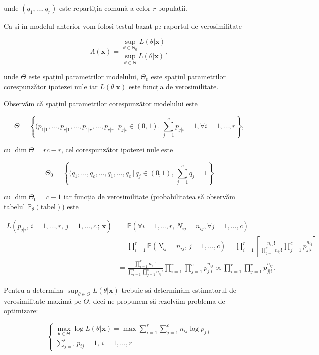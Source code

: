 \documentclass[]{article}
\begin{document}
unde \((q_1,\ldots, q_r)\) este repartiția comună a celor \(r\)
populații.

Ca și în modelul anterior vom folosi testul bazat pe raportul de
verosimilitate

\[
  \Lambda(\mathbf{x})=\frac{\sup_{\theta\in\Theta_0}L(\theta|\mathbf{x})}{\sup_{\theta\in\Theta}L(\theta|\mathbf{x})},
\]

unde \(\Theta\) este spațiul parametrilor modelului, \(\Theta_0\) este
spațiul parametrilor corespunzător ipotezei nule iar
\(L(\theta|\mathbf{x})\) este funcția de verosimilitate.

Observăm că spațiul parametrilor corespunzător modelului este

\[
\Theta = \left\{(p_{1|1},\ldots, p_{c|1},\ldots, p_{1|r},\ldots,p_{c|r}\,|\,p_{j|i}\in(0,1),\,\sum_{j = 1}^{c}p_{j|i} = 1, \forall i = 1,\ldots,r\right\},
\]

cu \(\dim{\Theta} = rc-r\), cel corespunzător ipotezei nule este

\[
\Theta_0 = \left\{(q_{1},\ldots, q_{c},\ldots, q_{1},\ldots,q_{c}\,|\,q_{j}\in(0,1),\,\sum_{j = 1}^{c}q_j = 1\right\}
\]

cu \(\dim{\Theta_0} = c-1\) iar funcția de verosimilitate
(probabilitatea să observăm tabelul
\(\mathbb{P}_{\theta}(\text{tabel})\)) este

\begin{align*}
  L(p_{j|i},\,i = 1,\ldots, r,\, j = 1,\ldots,c\,;\,\mathbf{x}) &= \mathbb{P}(\forall i = 1,\ldots, r,\, N_{ij} = n_{ij},\forall j = 1,\ldots,c) \\
    &= \prod_{i = 1}^{r}\mathbb{P}(N_{ij} = n_{ij},\, j = 1,\ldots,c) = \prod_{i = 1}^{r}\left[\frac{n_{i\cdot}!}{\prod_{j = 1}^{c}n_{ij}!}\prod_{j = 1}^{c} p_{j|i}^{n_{ij}}\right]\\
    & = \frac{\prod_{i = 1}^{r}n_{i\cdot}!}{\prod_{i = 1}^{r}\prod_{j = 1}^{c} n_{ij}!}\prod_{i = 1}^{r}\prod_{j = 1}^{c} p_{j|i}^{n_{ij}}\propto
    \prod_{i = 1}^{r}\prod_{j = 1}^{c} p_{j|i}^{n_{ij}}.
\end{align*}

Pentru a determina \(\sup_{\theta\in\Theta}L(\theta|\mathbf{x})\)
trebuie să determinăm estimatorul de verosimilitate maximă pe
\(\Theta\), deci ne propunem să rezolvăm problema de optimizare:

\[
  \left\{\begin{array}{ll}
    \max_{\theta\in\Theta} \log L(\theta|\mathbf{x}) = \max \sum_{i = 1}^{r}\sum_{j = 1}^{c}n_{ij}\log{p_{j|i}}\\
    \sum_{j = 1}^{c}p_{ij} = 1, \, i = 1,\ldots,r
  \end{array}\right.
\]
\end{document}
